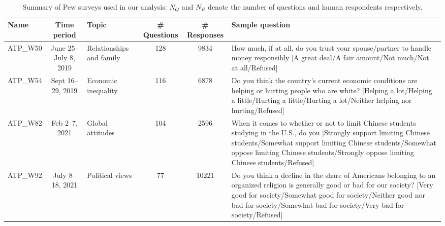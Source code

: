 \begin{table}[t]
    \ContinuedFloat
    \caption{Summary of Pew surveys used in our analysis: $N_Q$ and $N_R$ denote the number of questions and human respondents respectively.}
    \vskip 0.15in
    \renewcommand{\arraystretch}{1.25}
    \begin{center}
    \begin{small}
    
        \begin{tabular}{lcp{1.25cm}ccp{5cm}}
            \toprule
                Name &      Time period &                Topic &  \# Questions &  \# Responses &                                                                                                                                                                                                                                                                          Sample question \\
            \midrule
        ATP\_W50  & June 25–July 8, 2019 &   Relationships and family &          128 &         9834 &                                                                                                                                               How much, if at all, do you trust your spouse/partner to handle money responsibly [A great deal/A fair amount/Not much/Not at all/Refused] \\
        ATP\_W54  & Sept 16–29, 2019  &       Economic inequality &          116 &         6878 &                                                                                  Do you think the country's current economic conditions are helping or hurting people who are white? [Helping a lot/Helping a little/Hurting a little/Hurting a lot/Neither helping nor hurting/Refused] \\
        ATP\_W82  & Feb 2–7, 2021  &          Global attitudes &          104 &         2596 &               When it comes to whether or not to limit Chinese students studying in the U.S., do you [Strongly support limiting Chinese students/Somewhat support limiting Chinese students/Somewhat oppose limiting Chinese students/Strongly oppose limiting Chinese students/Refused] \\
        ATP\_W92  &  July 8–18, 2021   &         Political views &           77 &        10221 &                                                                                                                      Do you think a decline in the share of Americans belonging to an organized religion is generally good or bad for our society? [Very good for society/Somewhat good for society/Neither good nor bad for society/Somewhat bad for society/Very bad for society/Refused] \\
        \bottomrule
        \end{tabular}

\end{small}
\end{center}    
\vskip -0.1in
\end{table}